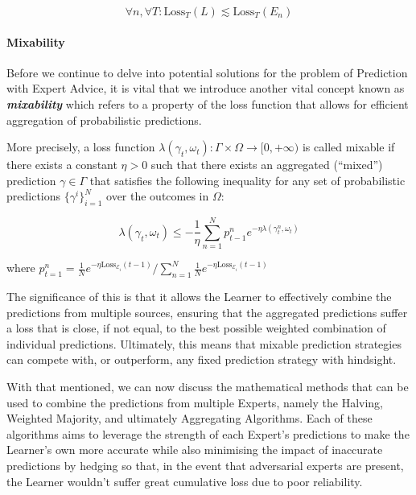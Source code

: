 \begin{equation}
    \forall n, \forall T: \text{Loss}_T(L) \lesssim \text{Loss}_T(E_n)
\end{equation}

\paragraph{Mixability}\label{paragaph:mixability}
Before we continue to delve into potential solutions for the problem of Prediction with Expert Advice, it is vital that we introduce another vital concept known as \textbf{\textit{mixability}} which refers to a property of the loss function that allows for efficient aggregation of probabilistic predictions.

More precisely, a loss function $\lambda(\gamma_t, \omega_t): \Gamma \times \Omega \rightarrow [0, +\infty)$ is called mixable if there exists a constant $\eta > 0$ such that there exists an aggregated (``mixed'') prediction $\gamma \in \Gamma$ that satisfies the following inequality for any set of probabilistic predictions $\{\gamma^i\}^N_{i=1}$ over the outcomes in $\Omega$:~\cite{kalnishkan:2022}

\begin{equation}
    \lambda(\gamma_t, \omega_t) \leq - \frac{1}{\eta}\underset{n=1}{\overset{N}{\sum}} p^n_{t-1} e^{-\eta\lambda(\gamma^n_t, \omega_t)}
\end{equation}

where $p^n_{t=1} = \frac{1}{N}e^{-\eta \text{Loss}_{\mathcal{E}_i}(t-1)}/{\sum^N_{n=1}\frac{1}{N}e^{-\eta\text{Loss}_{\mathcal{E}_i}(t-1)}}$\newline

The significance of this is that it allows the Learner to effectively combine the predictions from multiple sources, ensuring that the aggregated predictions suffer a loss that is close, if not equal, to the best possible weighted combination of individual predictions. Ultimately, this means that mixable prediction strategies can compete with, or outperform, any fixed prediction strategy with hindsight.

With that mentioned, we can now discuss the mathematical methods that can be used to combine the predictions from multiple Experts, namely the Halving, Weighted Majority, and ultimately Aggregating Algorithms. Each of these algorithms aims to leverage the strength of each Expert's predictions to make the Learner's own more accurate while also minimising the impact of inaccurate predictions by hedging so that, in the event that adversarial experts are present, the Learner wouldn't suffer great cumulative loss due to poor reliability.

